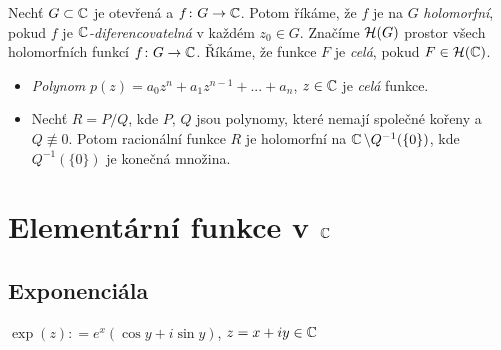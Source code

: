 
\begin{definition}
Nechť $G\subset \operatorname{\mathbb{C}}  $ je otevřená %
a $f \colon G \to \operatorname{\mathbb{C}}  $.
Potom říkáme, že $f$ je na $G$ \emph{holomorfní}, pokud $f$ je  $\operatorname{\mathbb{C}}  $\emph{-diferencovatelná} v každém $z_{0}\in {G}$. Značíme $\operatorname{\mathcal{H}} (G)$ prostor všech holomorfních funkcí $f \colon G \to \operatorname{\mathbb{C}}  $. Říkáme, že funkce $F$ je \emph{celá}, pokud $F\in \operatorname{\mathcal{H}} (\operatorname{\mathbb{C}}  )$.
\end{definition}
\begin{example}\mbox{}
\begin{itemize}
    \item \emph{Polynom} $p(z) = a_0z^{n}+a_1z^{n-1}+...+a_n$, $z\in \operatorname{\mathbb{C}}  $ je \emph{celá} funkce.
    \item Nechť $R=P/Q$, kde $P$, $Q$ jsou polynomy, které nemají společné kořeny a $Q\not\equiv 0$. Potom racionální funkce $R$ je holomorfní na $\operatorname{\mathbb{C}}  \setminus Q^{-1}(\{0\})$, kde $Q^{-1}(\{0\})$ je konečná množina.
\end{itemize}    
\end{example}


\section{Elementární funkce v \texorpdfstring{$\operatorname{\mathbb{C}}  $}{C}}
\subsection{Exponenciála}

\begin{definition}
$\exp(z)\colon=e^{x}(\cos y + i\sin y)$, $z=x+i y\in \operatorname{\mathbb{C}}  $
\end{definition}

